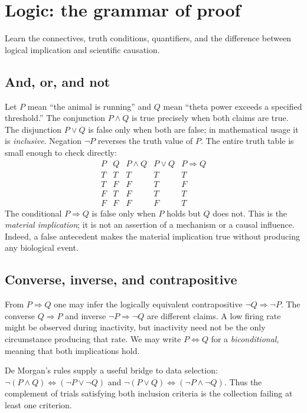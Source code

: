 \chapter{Logic: the grammar of proof}\label{ch:logic}
\begin{readergoal}Learn the connectives, truth conditions, quantifiers, and the difference between logical implication and scientific causation.\end{readergoal}
\section{And, or, and not}
Let $P$ mean ``the animal is running'' and $Q$ mean ``theta power exceeds a specified threshold.'' The conjunction $P\land Q$ is true precisely when both claims are true. The disjunction $P\lor Q$ is false only when both are false; in mathematical usage it is \emph{inclusive}. Negation $\neg P$ reverses the truth value of $P$. The entire truth table is small enough to check directly:
\[\begin{array}{cc|ccc}P&Q&P\land Q&P\lor Q&P\Rightarrow Q\\\hline
T&T&T&T&T\\T&F&F&T&F\\F&T&F&T&T\\F&F&F&F&T\end{array}\]
The conditional $P\Rightarrow Q$ is false only when $P$ holds but $Q$ does not. This is the \emph{material implication}; it is not an assertion of a mechanism or a causal influence. Indeed, a false antecedent makes the material implication true without producing any biological event.

\section{Converse, inverse, and contrapositive}
From $P\Rightarrow Q$ one may infer the logically equivalent contrapositive $\neg Q\Rightarrow\neg P$. The converse $Q\Rightarrow P$ and inverse $\neg P\Rightarrow\neg Q$ are different claims. A low firing rate might be observed during inactivity, but inactivity need not be the only circumstance producing that rate. We may write $P\Leftrightarrow Q$ for a \emph{biconditional}, meaning that both implications hold.

De Morgan's rules supply a useful bridge to data selection: $\neg(P\land Q)\Leftrightarrow(\neg P\lor\neg Q)$ and $\neg(P\lor Q)\Leftrightarrow(\neg P\land\neg Q)$. Thus the complement of trials satisfying both inclusion criteria is the collection failing at least one criterion.


